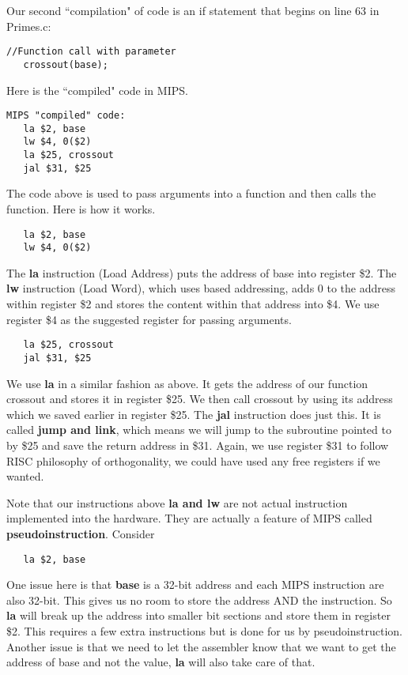\documentclass[11pt]{article}
\begin{document}

Our second ``compilation" of code is an if statement that begins on line 63 in Primes.c:
\begin{verbatim}
//Function call with parameter
   crossout(base);
\end{verbatim}

Here is the ``compiled" code in MIPS.

\begin{verbatim}
MIPS "compiled" code:
   la $2, base
   lw $4, 0($2)
   la $25, crossout
   jal $31, $25
\end{verbatim}

The code above is used to pass arguments into a function and then calls the function. Here is how it works. 

\begin{verbatim}
   la $2, base
   lw $4, 0($2)
\end{verbatim}

The {\bf la} instruction (Load Address) puts the address of base into register \$2. The {\bf lw} instruction (Load Word), which uses based addressing, adds 0 to the address within register \$2 and stores the content within that address into \$4. We use register \$4 as the suggested register for passing arguments.

\begin{verbatim}
   la $25, crossout
   jal $31, $25
\end{verbatim}

We use {\bf la} in a similar fashion as above. It gets the address of our function crossout and stores it in register \$25. We then call crossout by using its address which we saved earlier in register \$25. The {\bf jal} instruction does just this. It is called {\bf jump and link}, which means we will jump to the subroutine pointed to by \$25 and save the return address in \$31. Again, we use register \$31 to follow RISC philosophy of orthogonality, we could have used any free registers if we wanted.

Note that our instructions above {\bf la and lw} are not actual instruction implemented into the hardware. They are actually a feature of MIPS called {\bf pseudoinstruction}. Consider 

\begin{verbatim}
   la $2, base
\end{verbatim}

One issue here is that {\bf base} is a 32-bit address and each MIPS instruction are also 32-bit. This gives us no room to store the address AND the instruction. So {\bf la} will break up the address into smaller bit sections and store them in register \$2. This requires a few extra instructions but is done for us by pseudoinstruction. Another issue is that we need to let the assembler know that we want to get the address of base and not the value, {\bf la} will also take care of that.
\end{document}
